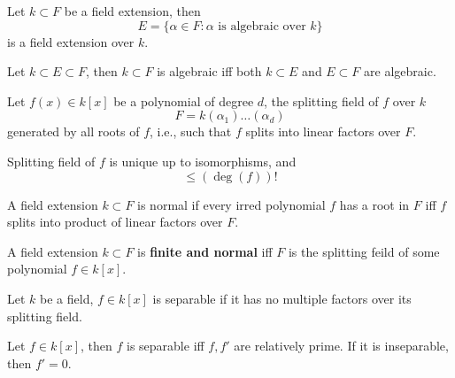 \documentclass[openany]{book}
\begin{document}
\begin{cor}
    Let $k\subset F$ be a field extension, then 
    \begin{equation*}
        E=\{\alpha\in F: \alpha\text{ is algebraic over $k$}\}
    \end{equation*}
    is a field extension over $k$.
\end{cor}

\begin{cor}
    Let $k\subset E\subset F$, then $k\subset F$ is algebraic iff both $k\subset E$ and $E\subset F$ are algebraic.
\end{cor}


\begin{defn}
    Let $f(x)\in k[x]$ be a polynomial of degree $d$, the splitting field of $f$ over $k$ 
    \begin{equation*}
        F=k(\alpha_1)\dots(\alpha_d)
    \end{equation*}
    generated by all roots of $f$, i.e., such that $f$ splits into linear factors over $F$.
\end{defn}

\begin{prop}
    Splitting field of $f$ is unique up to isomorphisms, and 
    \begin{equation*}
        [F:k]\leq(\deg(f))!
    \end{equation*}
\end{prop}


\begin{defn}
    A field extension $k\subset F$ is normal if every irred polynomial $f$ has a root in $F$ iff $f$ splits into product of linear factors over $F$.
\end{defn}

\begin{prop}[normal]
    A field extension $k\subset F$ is \textbf{finite and normal} iff $F$ is the splitting feild of some polynomial $f\in k[x]$.
\end{prop}



\begin{defn}
    Let $k$ be a field, $f\in k[x]$ is separable if it has no multiple factors over its splitting field.
\end{defn}

\begin{prop}
    Let $f\in k[x]$, then $f$ is separable iff $f, f'$ are relatively prime. If it is inseparable, then $f'=0$.
\end{prop}
\end{document}
